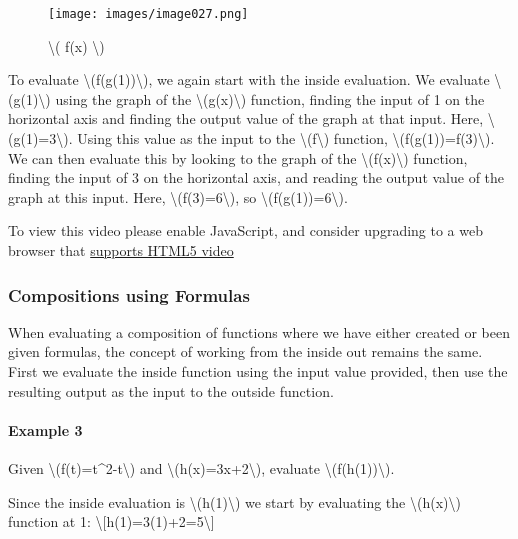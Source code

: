 \begin{figure}
\centering
\texttt{[image: images/image027.png]}
\caption{\textbackslash{}( f(x) \textbackslash{})}
\end{figure}

To evaluate \textbackslash{}(f(g(1))\textbackslash{}), we again start
with the inside evaluation. We evaluate
\textbackslash{}(g(1)\textbackslash{}) using the graph of the
\textbackslash{}(g(x)\textbackslash{}) function, finding the input of 1
on the horizontal axis and finding the output value of the graph at that
input. Here, \textbackslash{}(g(1)=3\textbackslash{}). Using this value
as the input to the \textbackslash{}(f\textbackslash{}) function,
\textbackslash{}(f(g(1))=f(3)\textbackslash{}). We can then evaluate
this by looking to the graph of the
\textbackslash{}(f(x)\textbackslash{}) function, finding the input of 3
on the horizontal axis, and reading the output value of the graph at
this input. Here, \textbackslash{}(f(3)=6\textbackslash{}), so
\textbackslash{}(f(g(1))=6\textbackslash{}).

To view this video please enable JavaScript, and consider upgrading to a
web browser that \href{http://videojs.com/html5-video-support/}{supports
HTML5 video}

\hypertarget{compositions-using-formulas}{%
\subsubsection{Compositions using
Formulas}\label{compositions-using-formulas}}

When evaluating a composition of functions where we have either created
or been given formulas, the concept of working from the inside out
remains the same. First we evaluate the inside function using the input
value provided, then use the resulting output as the input to the
outside function.

\hypertarget{example-3}{%
\paragraph{Example 3}\label{example-3}}

Given \textbackslash{}(f(t)=t\^{}2-t\textbackslash{}) and
\textbackslash{}(h(x)=3x+2\textbackslash{}), evaluate
\textbackslash{}(f(h(1))\textbackslash{}).

Since the inside evaluation is \textbackslash{}(h(1)\textbackslash{}) we
start by evaluating the \textbackslash{}(h(x)\textbackslash{}) function
at 1: \textbackslash{}{[}h(1)=3(1)+2=5\textbackslash{}{]}

